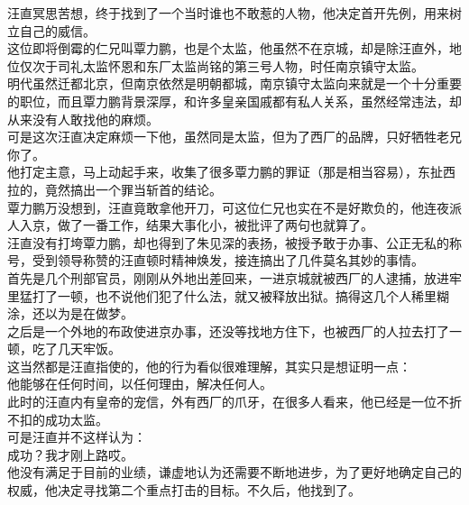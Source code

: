 \begin{multicols}{\theparacolNo}
汪直冥思苦想，终于找到了一个当时谁也不敢惹的人物，他决定首开先例，用来树立自己的威信。\\

这位即将倒霉的仁兄叫覃力鹏，也是个太监，他虽然不在京城，却是除汪直外，地位仅次于司礼太监怀恩和东厂太监尚铭的第三号人物，时任南京镇守太监。\\

明代虽然迁都北京，但南京依然是明朝都城，南京镇守太监向来就是一个十分重要的职位，而且覃力鹏背景深厚，和许多皇亲国戚都有私人关系，虽然经常违法，却从来没有人敢找他的麻烦。\\

可是这次汪直决定麻烦一下他，虽然同是太监，但为了西厂的品牌，只好牺牲老兄你了。\\

他打定主意，马上动起手来，收集了很多覃力鹏的罪证（那是相当容易），东扯西拉的，竟然搞出一个罪当斩首的结论。\\

覃力鹏万没想到，汪直竟敢拿他开刀，可这位仁兄也实在不是好欺负的，他连夜派人入京，做了一番工作，结果大事化小，被批评了两句也就算了。\\

汪直没有打垮覃力鹏，却也得到了朱见深的表扬，被授予敢于办事、公正无私的称号，受到领导称赞的汪直顿时精神焕发，接连搞出了几件莫名其妙的事情。\\

首先是几个刑部官员，刚刚从外地出差回来，一进京城就被西厂的人逮捕，放进牢里猛打了一顿，也不说他们犯了什么法，就又被释放出狱。搞得这几个人稀里糊涂，还以为是在做梦。\\

之后是一个外地的布政使进京办事，还没等找地方住下，也被西厂的人拉去打了一顿，吃了几天牢饭。\\

这当然都是汪直指使的，他的行为看似很难理解，其实只是想证明一点：\\

他能够在任何时间，以任何理由，解决任何人。\\

此时的汪直内有皇帝的宠信，外有西厂的爪牙，在很多人看来，他已经是一位不折不扣的成功太监。\\

可是汪直并不这样认为：\\

成功？我才刚上路哎。\\

他没有满足于目前的业绩，谦虚地认为还需要不断地进步，为了更好地确定自己的权威，他决定寻找第二个重点打击的目标。不久后，他找到了。\\


\end{multicols}
